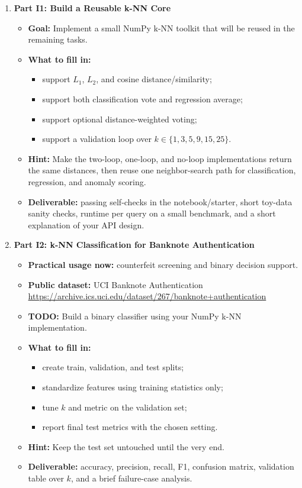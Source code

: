 \begin{enumerate}[label=\textbf{I\arabic*.}]
  \item \textbf{Part I1: Build a Reusable k-NN Core}
  \begin{itemize}
    \item \textbf{Goal:} Implement a small NumPy k-NN toolkit that will be reused in the remaining tasks.
    \item \textbf{What to fill in:}
    \begin{itemize}
      \item support $L_1$, $L_2$, and cosine distance/similarity;
      \item support both classification vote and regression average;
      \item support optional distance-weighted voting;
      \item support a validation loop over $k \in \{1,3,5,9,15,25\}$.
    \end{itemize}
    \item \textbf{Hint:} Make the two-loop, one-loop, and no-loop implementations return the same distances, then reuse one neighbor-search path for classification, regression, and anomaly scoring.
    \item \textbf{Deliverable:} passing self-checks in the notebook/starter, short toy-data sanity checks, runtime per query on a small benchmark, and a short explanation of your API design.
  \end{itemize}

  \item \textbf{Part I2: k-NN Classification for Banknote Authentication}
  \begin{itemize}
    \item \textbf{Practical usage now:} counterfeit screening and binary decision support.
    \item \textbf{Public dataset:} UCI Banknote Authentication\\
    \url{https://archive.ics.uci.edu/dataset/267/banknote+authentication}
    \item \textbf{TODO:} Build a binary classifier using your NumPy k-NN implementation.
    \item \textbf{What to fill in:}
    \begin{itemize}
      \item create train, validation, and test splits;
      \item standardize features using training statistics only;
      \item tune $k$ and metric on the validation set;
      \item report final test metrics with the chosen setting.
    \end{itemize}
    \item \textbf{Hint:} Keep the test set untouched until the very end.
    \item \textbf{Deliverable:} accuracy, precision, recall, F1, confusion matrix, validation table over $k$, and a brief failure-case analysis.
  \end{itemize}


\end{enumerate}
